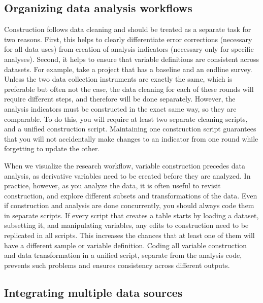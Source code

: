 \documentclass[
]{book}
\begin{document}
\hypertarget{organizing-data-analysis-workflows}{%
\subsection*{Organizing data analysis workflows}\label{organizing-data-analysis-workflows}}

Construction follows data cleaning and
should be treated as a separate task for two reasons.
First, this helps to clearly differentiate error corrections
(necessary for all data uses)
from creation of analysis indicators
(necessary only for specific analyses).
Second, it helps to ensure that variable definitions are
consistent across datasets.
For example, take a project that has a baseline and an endline survey.
Unless the two data collection instruments are exactly the same,
which is preferable but often not the case,
the data cleaning for each of these rounds will require different steps,
and therefore will be done separately.
However, the analysis indicators must be constructed in the exact same way,
so they are comparable.
To do this, you will require at least two separate cleaning scripts,
and a unified construction script.
Maintaining one construction script guarantees that you will not
accidentally make changes to an indicator from one round
while forgetting to update the other.

When we visualize the research workflow,
variable construction precedes data analysis,
as derivative variables need to be created before they are analyzed.
In practice, however, as you analyze the data,
it is often useful to revisit construction,
and explore different subsets and transformations of the data.
Even if construction and analysis are done concurrently,
you should always code them in separate scripts.
If every script that creates a table starts by loading a dataset,
subsetting it, and manipulating variables,
any edits to construction need to be replicated in all scripts.
This increases the chances that at least one of them
will have a different sample or variable definition.
Coding all variable construction and data transformation
in a unified script, separate from the analysis code,
prevents such problems and ensures consistency across different outputs.

\hypertarget{integrating-multiple-data-sources}{%
\subsection*{Integrating multiple data sources}\label{integrating-multiple-data-sources}}
\end{document}

